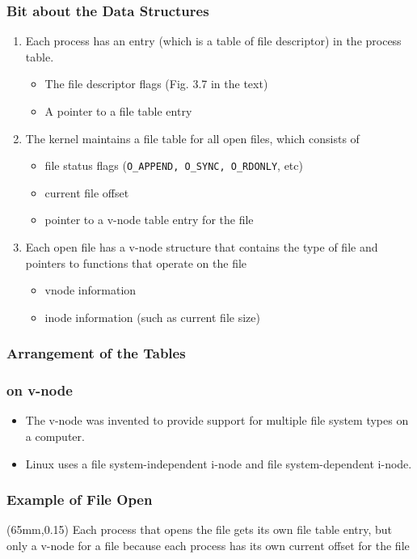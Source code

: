 \documentclass[newPxFont,sthlmFooter,nooffset]{beamer}
\begin{document}
\begin{frame}
  \frametitle{Bit about the Data Structures}
\begin{enumerate}
\item Each process has an entry (which is a table of file descriptor) in the process table. 
  \begin{itemize}
  \item The file descriptor flags (Fig. 3.7 in the text)
  \item A pointer to a file table entry
  \end{itemize}
\item The kernel maintains a file table for all open files, which consists of
  \begin{itemize}
  \item file status flags (\texttt{O\_APPEND, O\_SYNC, O\_RDONLY}, etc)
  \item current file offset
  \item pointer to a v-node table entry for the file
  \end{itemize}
\item Each open file has a v-node structure that contains the type of file and pointers to functions that operate on the file
  \begin{itemize}
  \item vnode information
  \item inode information (such as current file size)
  \end{itemize}
\end{enumerate}
\end{frame}

\begin{frame}
  \frametitle{Arrangement of the Tables}
\centering
{}

\end{frame}


\begin{frame}
  \frametitle{on v-node}
\begin{itemize}
\item The v-node was invented to provide support for multiple file system types on a computer.
\item Linux uses a file system-independent i-node and file system-dependent i-node.
\end{itemize}
\end{frame}

\begin{frame}
  \frametitle{Example of File Open}
\centering
{}
\begin{textblock*}{60mm}(65mm,0.15\textheight)
{\footnotesize Each process that opens the file gets its own file table entry, but only a v-node for a file because each process has its own current offset for the file }
\end{textblock*}
\end{frame}
\end{document}
